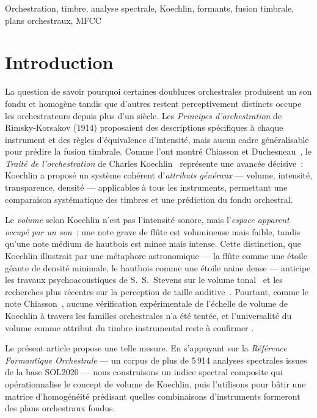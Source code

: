 \documentclass[journal]{IEEEtran}
\begin{document}
\begin{IEEEkeywords}
Orchestration, timbre, analyse spectrale, Koechlin, formants, fusion timbrale, plans orchestraux, MFCC
\end{IEEEkeywords}

\section{Introduction}
\label{sec:intro}

La question de savoir pourquoi certaines doublures orchestrales produisent un son fondu et homogène tandis que d'autres restent perceptivement distincts occupe les orchestrateurs depuis plus d'un siècle. Les \textit{Principes d'orchestration} de Rimsky-Korsakov (1914) proposaient des descriptions spécifiques à chaque instrument et des règles d'équivalence d'intensité, mais aucun cadre généralisable pour prédire la fusion timbrale. Comme l'ont montré Chiasson et Duchesneau~\cite{Chiasson2008, DuchesneauChiasson}, le \textit{Traité de l'orchestration} de Charles Koechlin~\cite{Koechlin1954} représente une avancée décisive~: Koechlin a proposé un système cohérent d'\emph{attributs généraux} --- volume, intensité, transparence, densité --- applicables à tous les instruments, permettant une comparaison systématique des timbres et une prédiction du fondu orchestral.

Le \textit{volume} selon Koechlin n'est pas l'intensité sonore, mais l'\emph{espace apparent occupé par un son}~: une note grave de flûte est volumineuse mais faible, tandis qu'une note médium de hautbois est mince mais intense. Cette distinction, que Koechlin illustrait par une métaphore astronomique --- la flûte comme une étoile géante de densité minimale, le hautbois comme une étoile naine dense --- anticipe les travaux psychoacoustiques de S.~S.~Stevens sur le volume tonal~\cite{Stevens1965} et les recherches plus récentes sur la perception de taille auditive~\cite{VanDinther2006}. Pourtant, comme le note Chiasson~\cite{ChiassonHumaniste}, aucune vérification expérimentale de l'échelle de volume de Koechlin à travers les familles orchestrales n'a été tentée, et \og l'universalité du volume comme attribut du timbre instrumental reste à confirmer \fg.

Le présent article propose une telle mesure. En s'appuyant sur la \textit{Référence Formantique Orchestrale} --- un corpus de plus de 5\,914 analyses spectrales issues de la base SOL2020 --- nous construisons un indice spectral composite qui opérationnalise le concept de volume de Koechlin, puis l'utilisons pour bâtir une matrice d'homogénéité prédisant quelles combinaisons d'instruments formeront des plans orchestraux fondus.
\end{document}

